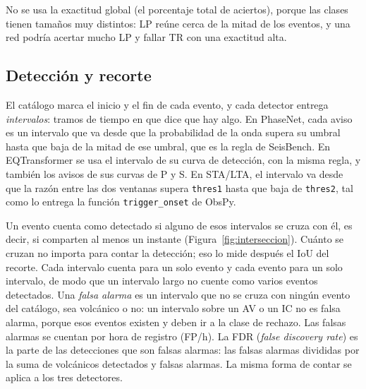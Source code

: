 No se usa la exactitud global (el porcentaje total de aciertos), porque las
clases tienen tamaños muy distintos: LP reúne cerca de la mitad de los
eventos, y una red podría acertar mucho LP y fallar TR con una exactitud alta.

\subsection{Detección y recorte}
\label{subsec:protocolo-deteccion}

El catálogo marca el inicio y el fin de cada evento, y cada detector entrega
\emph{intervalos}: tramos de tiempo en que dice que hay algo. En PhaseNet,
cada aviso es un intervalo que va desde que la probabilidad de la onda supera
su umbral hasta que baja de la mitad de ese umbral, que es la regla de
SeisBench. En EQTransformer se usa el intervalo de su curva de detección, con
la misma regla, y también los avisos de sus curvas de P y S. En STA/LTA, el
intervalo va desde que la razón entre las dos ventanas supera
\texttt{thres1} hasta que baja de \texttt{thres2}, tal como lo entrega la
función \texttt{trigger\_onset} de ObsPy.

Un evento cuenta como detectado si alguno de esos intervalos se cruza con él,
es decir, si comparten al menos un instante (Figura~\ref{fig:interseccion}).
Cuánto se cruzan no importa para contar la detección; eso lo mide después el
IoU del recorte. Cada intervalo cuenta para un solo evento y cada evento para
un solo intervalo, de modo que un intervalo largo no cuente como varios
eventos detectados. Una \emph{falsa alarma} es un intervalo que no se cruza
con ningún evento del catálogo, sea volcánico o no: un intervalo sobre un AV
o un IC no es falsa alarma, porque esos eventos existen y deben ir a la clase
de rechazo. Las falsas alarmas se cuentan por hora de registro (FP/h). La FDR
(\emph{false discovery rate}) es la parte de las detecciones que son falsas
alarmas: las falsas alarmas divididas por la suma de volcánicos detectados y
falsas alarmas. La misma forma de contar se aplica a los tres detectores.

